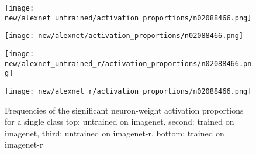 \documentclass{article}
\begin{document}
            \begin{figure}[H]
                \centering
                \begin{minipage}{\textwidth}
                    \centering
                    \texttt{[image: new/alexnet\_untrained/activation\_proportions/n02088466.png]}
                    
                \end{minipage}\hfill
                \begin{minipage}{\textwidth}
                    \centering
                    \texttt{[image: new/alexnet/activation\_proportions/n02088466.png]}
                \end{minipage}
                \begin{minipage}{\textwidth}
                    \centering
                    \texttt{[image: new/alexnet\_untrained\_r/activation\_proportions/n02088466.png]}
                    
                \end{minipage}\hfill
                \begin{minipage}{\textwidth}
                    \centering
                    \texttt{[image: new/alexnet\_r/activation\_proportions/n02088466.png]}
                \end{minipage}
                
                \caption{Frequencies of the significant neuron-weight activation proportions for a single class top: untrained on imagenet, second: trained on imagenet, third: untrained on imagenet-r, bottom: trained on imagenet-r}
                \label{fig:frequency_neuron_weight1}
            \end{figure}
            
                    
                    
\end{document}
